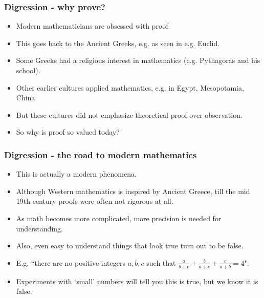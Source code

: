 \documentclass[handout]{beamer}
\begin{document}
\begin{frame}
\frametitle{Digression - why prove?}
\begin{itemize}
\item Modern mathematicians are obsessed with proof.
\vspace{0.3cm}
\item This goes back to the Ancient Greeks, e.g. as seen in e.g. Euclid.
\vspace{0.3cm}
\item Some Greeks had a religious interest in mathematics (e.g. Pythagoras and his school).
\vspace{0.3cm}
\item Other earlier cultures applied mathematics, e.g. in Egypt, Mesopotamia, China.
\vspace{0.3cm}
\item But these cultures did not emphasize theoretical proof over observation.
\vspace{0.3cm}
\item So why is proof so valued today?
\end{itemize}
\end{frame}

\begin{frame}
\frametitle{Digression - the road to modern mathematics}
\begin{itemize}
\item This is actually a modern phenomena.
\vspace{0.2cm}
\item Although Western mathematics is inspired by Ancient Greece, till the mid 19th century proofs were often not rigorous at all.
\vspace{0.2cm}
\item As math becomes more complicated, more precision is needed for understanding.
\vspace{0.2cm}
\item Also, even easy to understand things that look true turn out to be false.
\vspace{0.2cm}
\item E.g. ``there are no positive integers $a,b,c$ such that $\frac{a}{b+c} + \frac{b}{a+c} + \frac{c}{a+b} = 4$".
\vspace{0.2cm}
\item Experiments with `small' numbers will tell you this is true, but we know it is false.
\end{itemize}
\end{frame}
\end{document}
